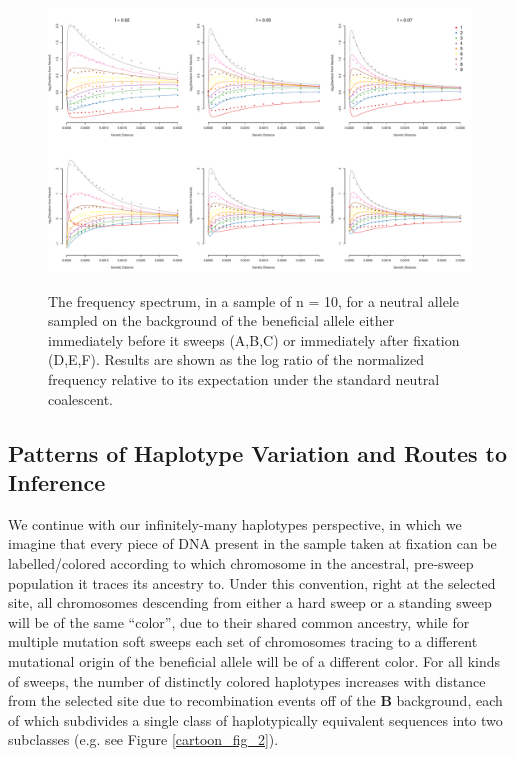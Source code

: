 \documentclass[a4paper,10pt]{article}
\begin{document}
\begin{figure}
	\includegraphics[width = \textwidth]{../Paper_Figures/freq_spec_nosweep_logfold_sixpanel_020507.pdf} \label{freq_spec}
	\caption{The frequency spectrum, in a sample of n = 10, for a neutral allele sampled on the background of the beneficial allele either immediately before it sweeps (A,B,C) or immediately after fixation (D,E,F). Results are shown as the log ratio of the normalized frequency relative to its expectation under the standard neutral coalescent.}
\end{figure}

\subsection*{Patterns of Haplotype Variation and Routes to Inference}


We continue with our infinitely-many haplotypes perspective, in which we imagine that every piece of DNA present in the sample taken at fixation can be labelled/colored according to which chromosome in the ancestral, pre-sweep population it traces its ancestry to. Under this convention, right at the selected site, all chromosomes descending from either a hard sweep or a standing sweep will be of the same ``color'', due to their shared common ancestry, while for multiple mutation soft sweeps each set of chromosomes tracing to a different mutational origin of the beneficial allele will be of a different color. For all kinds of sweeps, the number of distinctly colored haplotypes increases with distance from the selected site due to recombination events off of the \textbf{B} background, each of which subdivides a single class of haplotypically equivalent sequences into two subclasses (e.g. see Figure \ref{cartoon_fig_2}).
\end{document}
